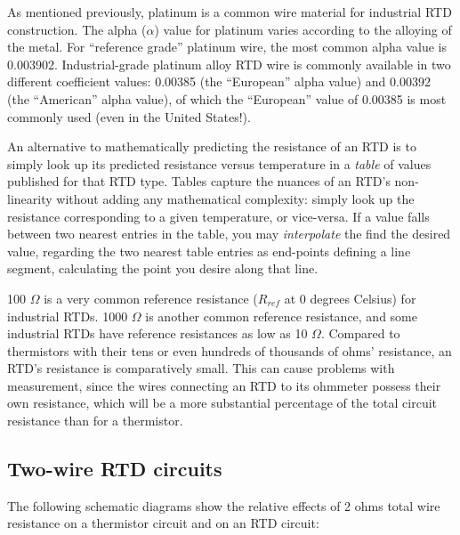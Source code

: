 As mentioned previously, platinum is a common wire material for industrial RTD construction.  The alpha ($\alpha$) value for platinum varies according to the alloying of the metal.  For ``reference grade'' platinum wire, the most common alpha value is 0.003902.  Industrial-grade platinum alloy RTD wire is commonly available in two different coefficient values: 0.00385 (the ``European'' alpha value) and 0.00392 (the ``American'' alpha value), of which the ``European'' value of 0.00385 is most commonly used (even in the United States!).      

An alternative to mathematically predicting the resistance of an RTD is to simply look up its predicted resistance versus temperature in a \textit{table} of values published for that RTD type.  Tables capture the nuances of an RTD's non-linearity without adding any mathematical complexity: simply look up the resistance corresponding to a given temperature, or vice-versa.  If a value falls between two nearest entries in the table, you may \textit{interpolate} the find the desired value, regarding the two nearest table entries as end-points defining a line segment, calculating the point you desire along that line.    

\vskip 10pt

100 $\Omega$ is a very common reference resistance ($R_{ref}$ at 0 degrees Celsius) for industrial RTDs.  1000 $\Omega$ is another common reference resistance, and some industrial RTDs have reference resistances as low as 10 $\Omega$.  Compared to thermistors with their tens or even hundreds of thousands of ohms' resistance, an RTD's resistance is comparatively small.  This can cause problems with measurement, since the wires connecting an RTD to its ohmmeter possess their own resistance, which will be a more substantial percentage of the total circuit resistance than for a thermistor.  






\filbreak
\subsection{Two-wire RTD circuits}

The following schematic diagrams show the relative effects of 2 ohms total wire resistance on a thermistor circuit and on an RTD circuit:


